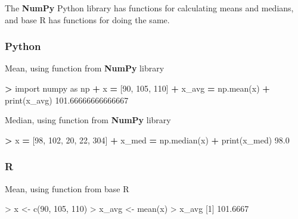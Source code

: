 \documentclass[
]{book}
\newenvironment{Shaded}{\begin{snugshade}}{\end{snugshade}}
\newcommand{\BuiltInTok}[1]{#1}
\newcommand{\DecValTok}[1]{\textcolor[rgb]{0.00,0.00,0.81}{#1}}
\newcommand{\FloatTok}[1]{\textcolor[rgb]{0.00,0.00,0.81}{#1}}
\newcommand{\FunctionTok}[1]{\textcolor[rgb]{0.00,0.00,0.00}{#1}}
\newcommand{\ImportTok}[1]{#1}
\newcommand{\NormalTok}[1]{#1}
\newcommand{\OperatorTok}[1]{\textcolor[rgb]{0.81,0.36,0.00}{\textbf{#1}}}
\newcommand{\OtherTok}[1]{\textcolor[rgb]{0.56,0.35,0.01}{#1}}
\newcommand{\SpecialCharTok}[1]{\textcolor[rgb]{0.00,0.00,0.00}{#1}}
\begin{document}
The \textbf{NumPy} Python library has functions for calculating means and medians, and base R has functions for doing the same.

\hypertarget{python-6}{%
\subsubsection*{Python}\label{python-6}}

Mean, using function from \textbf{NumPy} library

\begin{Shaded}
\begin{Highlighting}[]
\OperatorTok{\textgreater{}} \ImportTok{import}\NormalTok{ numpy }\ImportTok{as}\NormalTok{ np}
\OperatorTok{+}\NormalTok{ x }\OperatorTok{=}\NormalTok{ [}\DecValTok{90}\NormalTok{, }\DecValTok{105}\NormalTok{, }\DecValTok{110}\NormalTok{]}
\OperatorTok{+}\NormalTok{ x\_avg }\OperatorTok{=}\NormalTok{ np.mean(x)}
\OperatorTok{+} \BuiltInTok{print}\NormalTok{(x\_avg)}
\FloatTok{101.66666666666667}
\end{Highlighting}
\end{Shaded}

Median, using function from \textbf{NumPy} library

\begin{Shaded}
\begin{Highlighting}[]
\OperatorTok{\textgreater{}}\NormalTok{ x }\OperatorTok{=}\NormalTok{ [}\DecValTok{98}\NormalTok{, }\DecValTok{102}\NormalTok{, }\DecValTok{20}\NormalTok{, }\DecValTok{22}\NormalTok{, }\DecValTok{304}\NormalTok{]}
\OperatorTok{+}\NormalTok{ x\_med }\OperatorTok{=}\NormalTok{ np.median(x)}
\OperatorTok{+} \BuiltInTok{print}\NormalTok{(x\_med)}
\FloatTok{98.0}
\end{Highlighting}
\end{Shaded}

\hypertarget{r-6}{%
\subsubsection*{R}\label{r-6}}

Mean, using function from base R

\begin{Shaded}
\begin{Highlighting}[]
\SpecialCharTok{\textgreater{}}\NormalTok{ x }\OtherTok{\textless{}{-}} \FunctionTok{c}\NormalTok{(}\DecValTok{90}\NormalTok{, }\DecValTok{105}\NormalTok{, }\DecValTok{110}\NormalTok{)}
\SpecialCharTok{\textgreater{}}\NormalTok{ x\_avg }\OtherTok{\textless{}{-}} \FunctionTok{mean}\NormalTok{(x)}
\SpecialCharTok{\textgreater{}}\NormalTok{ x\_avg}
\NormalTok{[}\DecValTok{1}\NormalTok{] }\FloatTok{101.6667}
\end{Highlighting}
\end{Shaded}
\end{document}

